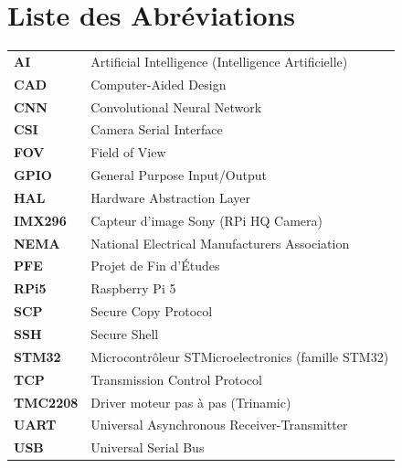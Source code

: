 \chapter*{Liste des Abréviations}

\begin{tabular}{ll}
\textbf{AI}     & Artificial Intelligence (Intelligence Artificielle) \\
\textbf{CAD}    & Computer-Aided Design \\
\textbf{CNN}    & Convolutional Neural Network \\
\textbf{CSI}    & Camera Serial Interface \\
\textbf{FOV}    & Field of View \\
\textbf{GPIO}   & General Purpose Input/Output \\
\textbf{HAL}    & Hardware Abstraction Layer \\
\textbf{IMX296} & Capteur d'image Sony (RPi HQ Camera) \\
\textbf{NEMA}   & National Electrical Manufacturers Association \\
\textbf{PFE}    & Projet de Fin d'Études \\
\textbf{RPi5}   & Raspberry Pi 5 \\
\textbf{SCP}    & Secure Copy Protocol \\
\textbf{SSH}    & Secure Shell \\
\textbf{STM32}  & Microcontrôleur STMicroelectronics (famille STM32) \\
\textbf{TCP}    & Transmission Control Protocol \\
\textbf{TMC2208}& Driver moteur pas à pas (Trinamic) \\
\textbf{UART}   & Universal Asynchronous Receiver-Transmitter \\
\textbf{USB}    & Universal Serial Bus \\
\end{tabular}
